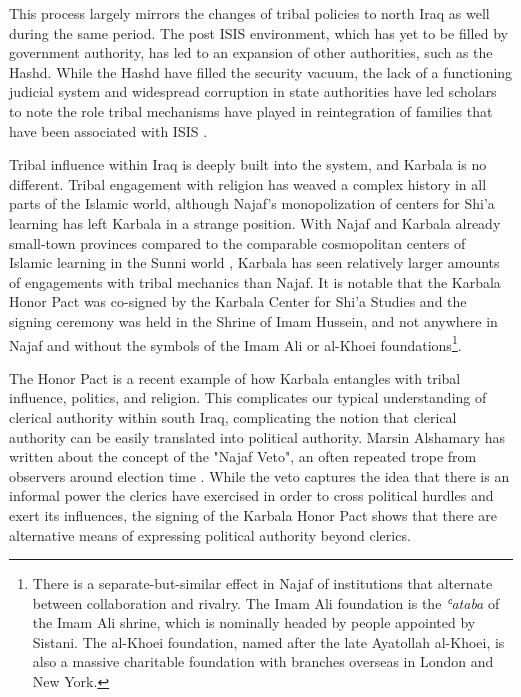 This process largely mirrors the changes of tribal policies to north Iraq as well during the same period. The post ISIS environment, which has yet to be filled by government authority, has led to an expansion of other authorities, such as the Hashd. While the Hashd have filled the security vacuum, the lack of a functioning judicial system and widespread corruption in state authorities have led scholars to note the role tribal mechanisms have played in reintegration of families that have been associated with ISIS \cite{genat_state_2023}.

Tribal influence within Iraq is deeply built into the system, and Karbala is no different. Tribal engagement with religion has weaved a complex history in all parts of the Islamic world, although Najaf's monopolization of centers for Shi'a learning has left Karbala in a strange position. With Najaf and Karbala already small-town provinces compared to the comparable cosmopolitan centers of Islamic learning in the Sunni world \cite{litvak_shii_2002}, Karbala has seen relatively larger amounts of engagements with tribal mechanics than Najaf. It is notable that the Karbala Honor Pact was co-signed by the Karbala Center for Shi'a Studies and the signing ceremony was held in the Shrine of Imam Hussein, and not anywhere in Najaf and without the symbols of the Imam Ali or al-Khoei foundations\footnote{There is a separate-but-similar effect in Najaf of institutions that alternate between collaboration and rivalry. The Imam Ali foundation is the \emph{ʿataba} of the Imam Ali shrine, which is nominally headed by people appointed by Sistani. The al-Khoei foundation, named after the late Ayatollah al-Khoei, is also a massive charitable foundation with branches overseas in London and New York.}. 


The Honor Pact is a recent example of how Karbala entangles with tribal influence, politics, and religion. This complicates our typical understanding of clerical authority within south Iraq, complicating the notion that clerical authority can be easily translated into political authority. Marsin Alshamary has written about the concept of the "Najaf Veto", an often repeated trope from observers around election time \cite{alshamary_shia_2022}. While the veto captures the idea that there is an informal power the clerics have exercised in order to cross political hurdles and exert its influences, the signing of the Karbala Honor Pact shows that there are alternative means of expressing political authority beyond clerics. 

